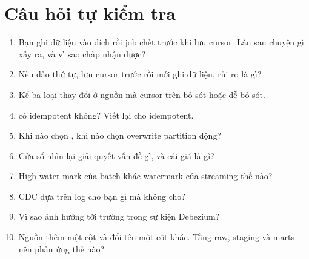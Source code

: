 \section{Câu hỏi tự kiểm tra}
\begin{enumerate}
  \item Bạn ghi dữ liệu vào đích rồi job chết trước khi lưu cursor. Lần sau chuyện gì xảy ra, và vì sao chấp nhận được?
  \item Nếu đảo thứ tự, lưu cursor trước rồi mới ghi dữ liệu, rủi ro là gì?
  \item Kể ba loại thay đổi ở nguồn mà cursor trên  bỏ sót hoặc dễ bỏ sót.
  \item {} có idempotent không? Viết lại cho idempotent.
  \item Khi nào chọn , khi nào chọn overwrite partition động?
  \item Cửa sổ nhìn lại giải quyết vấn đề gì, và cái giá là gì?
  \item High-water mark của batch khác watermark của streaming thế nào?
  \item CDC dựa trên log cho bạn gì mà  không cho?
  \item Vì sao  ảnh hưởng tới trường  trong sự kiện Debezium?
  \item Nguồn thêm một cột và đổi tên một cột khác. Tầng raw, staging và marts nên phản ứng thế nào?
\end{enumerate}

